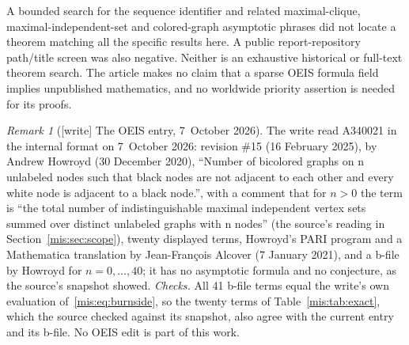 \documentclass[11pt]{article}
\theoremstyle{remark}\newtheorem{remark}[theorem]{Remark}
\begin{document}
A bounded search for the sequence identifier and related maximal-clique, maximal-independent-set and colored-graph asymptotic phrases did not locate a theorem matching all the specific results here. A public report-repository path/title screen was also negative. Neither is an exhaustive historical or full-text theorem search. The article makes no claim that a sparse OEIS formula field implies unpublished mathematics, and no worldwide priority assertion is needed for its proofs.

\begin{remark}[{[write]} The OEIS entry, 7~October 2026]\label{mis:rem:oeis}
The write read A340021 in the internal format on 7~October 2026: revision \#15
(16 February 2025), by Andrew Howroyd (30 December 2020), ``Number of bicolored
graphs on n unlabeled nodes such that black nodes are not adjacent to each
other and every white node is adjacent to a black node.'', with a comment that
for $n>0$ the term is ``the total number of indistinguishable maximal
independent vertex sets summed over distinct unlabeled graphs with n nodes''
(the source's reading in Section~\ref{mis:sec:scope}), twenty displayed terms,
Howroyd's PARI program and a Mathematica translation by Jean-Fran\c{c}ois
Alcover (7 January 2021), and a b-file by Howroyd for $n=0,\ldots,40$; it has no
asymptotic formula and no conjecture, as the source's snapshot showed.
\emph{Checks.} All 41 b-file terms equal the write's own evaluation
of~\eqref{mis:eq:burnside}, so the twenty terms of Table~\ref{mis:tab:exact},
which the source checked against its snapshot, also agree with the current
entry and its b-file. No OEIS edit is part of this work.
\end{remark}
\end{document}
